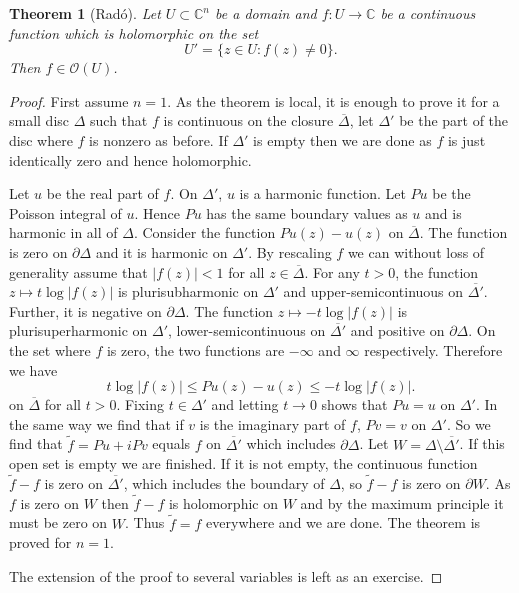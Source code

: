 \documentclass[12pt,openany]{book}
\newcommand{\abs}[1]{\left\lvert {#1} \right\rvert}
\newcommand{\C}{{\mathbb{C}}}
\newcommand{\sO}{{\mathcal{O}}}
\theoremstyle{plain}
\newtheorem{thm}{Theorem}[section]
\theoremstyle{remark}
\theoremstyle{definition}
\theoremstyle{exercise}
\theoremstyle{example}
\begin{document}
\begin{thm}[Rad\'o] 
Let $U \subset \C^n$ be a domain and $f \colon U \to \C$ be a continuous
function which is holomorphic on the set
\begin{equation*}
U' = \{ z \in U : f(z) \not= 0 \} .
\end{equation*}
Then $f \in \sO(U)$.
\end{thm}

\begin{proof}
First assume $n=1$.  As the theorem is local, it is
enough to prove it for a small disc $\Delta$ such that $f$ is continuous
on the closure $\overline{\Delta}$, let $\Delta'$ be the part of the disc
where $f$ is nonzero as before.  If $\Delta'$ is empty then we are done as
$f$ is just identically zero and hence holomorphic.


Let $u$ be the real part of $f$.  On $\Delta'$, $u$ is a harmonic function.
Let $Pu$ be the Poisson integral of $u$.  Hence $Pu$ has the same boundary
values as $u$ and is harmonic in all of $\Delta$.  Consider the function
$Pu(z) - u(z)$ on $\overline{\Delta}$.  The function is zero
on $\partial \Delta$ and it is harmonic on $\Delta'$.  By rescaling $f$
we can without loss of generality assume that $\abs{f(z)} < 1$ for all $z
\in \overline{\Delta}$.  For any $t >0$, the function 
$z \mapsto t \log \abs{f(z)}$ is plurisubharmonic on $\Delta'$ and
upper-semicontinuous on $\overline{\Delta'}$.  Further, it is negative
on $\partial \Delta$.  The function $z \mapsto -t \log \abs{f(z)}$ is
plurisuperharmonic on $\Delta'$,
lower-semicontinuous on $\overline{\Delta'}$ and positive on $\partial
\Delta$.  On the set where $f$ is zero, the two functions are $-\infty$ and
$\infty$ respectively.  Therefore we have
\begin{equation*}
t \log \abs{f(z)} \leq Pu(z)-u(z) \leq -t \log \abs{f(z)} .
\end{equation*}
on $\overline{\Delta}$ for all $t > 0$.  Fixing $t \in \Delta'$ and letting
$t \to 0$ shows that $Pu = u$ on $\Delta'$.  In the same way we find that if
$v$ is the imaginary part of $f$, $Pv = v$ on $\Delta'$.  So we find that
$\tilde{f} = Pu + i Pv$ equals $f$ on $\overline{\Delta'}$ which includes
$\partial \Delta$.
Let $W = \Delta \setminus \overline{\Delta'}$.  If
this open set is empty we are finished.  If it is not empty,
the continuous
function $\tilde{f}-f$ is zero on $\overline{\Delta'}$, which includes
the boundary of $\Delta$, so $\tilde{f}-f$ is zero on $\partial W$.
As $f$ is zero on $W$ then $\tilde{f}-f$ is holomorphic on $W$ and
by the maximum principle it must be zero on $W$.  Thus
$\tilde{f} = f$ everywhere and we are done.  The theorem is proved for
$n=1$.

The extension of the proof to several variables is left as an exercise.
\end{proof}
\end{document}
